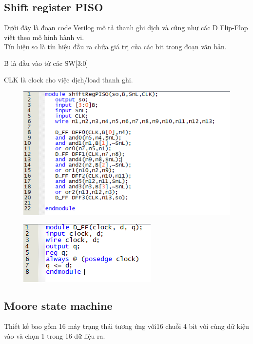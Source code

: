 \documentclass[a4paper]{article}
\begin{document}
	\subsection{Shift register PISO}
	
	Dưới đây là đoạn code Verilog mô tả thanh ghi dịch và cũng như các D Flip-Flop viết theo mô hình hành vi.\\
	
	Tín hiệu so là tín hiệu đầu ra chứa giá trị của các bit trong đoạn văn bản.
	
	B là đầu vào từ các SW[3:0]
	
	CLK là clock cho việc dịch/load thanh ghi.
	\begin{center}
	\begin{figure}[htp]
		\begin{center}
			\includegraphics[scale=1]{shiftRegPISO.png}
		\end{center}
	\end{figure}
	\end{center}
	\begin{center}
	\begin{figure}[htp]
		\begin{center}
			\includegraphics[scale=1.5]{Capture.png}
		\end{center}
	\end{figure}
	\end{center}
	
	\subsection{Moore state machine}
	Thiết kế bao gồm 16 máy trạng thái tương ứng với16 chuỗi 4 bit với cùng dữ kiệu vào và chọn 1 trong 16 dữ liệu ra.
	
\end{document}

